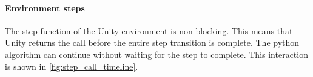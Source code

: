 \paragraph{Environment steps}
\label{sec:non_blocking_step_calls}

The step function of the Unity environment is non-blocking. This means that Unity returns the call before the entire step transition is complete. The python algorithm can continue without waiting for the step to complete. This interaction is shown in \ref{fig:step_call_timeline}.





\newcommand\po{-3}

\newcommand\fo{-5}

